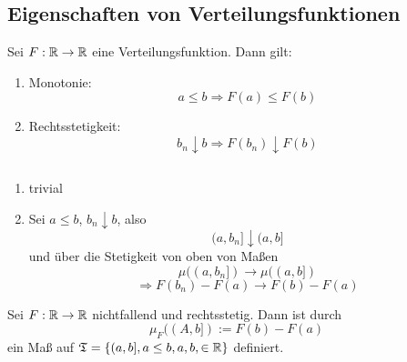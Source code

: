 		\subsection{Eigenschaften von Verteilungsfunktionen}
			\begin{satz}
				Sei $F:\mathbb{R}\to\mathbb{R}$ eine Verteilungsfunktion. Dann gilt:
				\begin{enumerate}
					\item Monotonie:
					\[ a\le b\Rightarrow F(a)\le F(b) \]
					\item Rechtsstetigkeit:
					\[ b_n\downarrow b\Rightarrow F(b_n)\downarrow F(b) \]
				\end{enumerate}
			\end{satz}
			
			\begin{bew} $\text{  }$ %
				
				\begin{enumerate}
					\item trivial
					\item Sei $a\le b$, $b_n\downarrow b$, also
					\[ (a,b_n]\downarrow (a,b] \]
					und über die Stetigkeit von oben von Maßen
					\[ \mu((a,b_n])\to \mu((a,b]) \]
					\[ \Rightarrow F(b_n)-F(a)\to F(b)-F(a) \]
				\end{enumerate}
			\end{bew}
			
			\begin{satz}
				Sei $F:\mathbb{R}\to\mathbb{R}$ nichtfallend und rechtsstetig. Dann ist durch 
				\[ \mu_F((A,b]):=F(b)-F(a) \]
				ein Maß auf $\mathfrak{T}=\{(a,b], a\le b, a,b,\in\mathbb{R}\}$ definiert.
			\end{satz}
			
